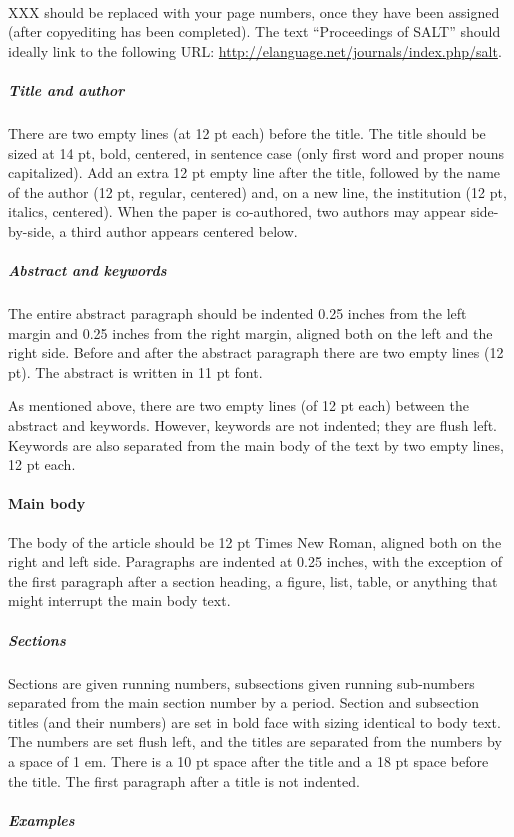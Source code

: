 \documentclass{salt}
\begin{document}
\

XXX should be replaced with your page numbers, once they have been assigned (after copyediting has been completed). The text ``Proceedings of SALT'' should ideally link to the following URL: \url{http://elanguage.net/journals/index.php/salt}.

\subparagraph{Title and author}
There are two empty lines (at 12 pt each) before the title. The title should be sized at 14 pt, bold, centered, in sentence case (only first word and proper nouns capitalized). Add an extra 12 pt empty line after the title, followed by the name of the author (12 pt, regular, centered) and, on a new line, the institution (12 pt, italics, centered). When the paper is co-authored, two authors may appear side-by-side, a third author appears centered below.

\subparagraph{Abstract and keywords}
The entire abstract paragraph should be indented 0.25 inches from the left margin and 0.25 inches from the right margin, aligned both on the left and the right side. Before and after the abstract paragraph there are two empty lines (12 pt). The abstract is written in 11 pt font.

As mentioned above, there are two empty lines (of 12 pt each) between the abstract and keywords. However, keywords are not indented; they are flush left. Keywords are also separated from the main body of the text by two empty lines, 12 pt each.


\paragraph{Main body}
The body of the article should be 12 pt Times New Roman, aligned both on the right and left side. Paragraphs are indented at 0.25 inches, with the exception of the first paragraph after a section heading, a figure, list, table, or anything that might interrupt the main body text.

\subparagraph{Sections}

Sections are given running numbers, subsections given running sub-numbers separated from the main section number by a period. Section and subsection titles (and their numbers) are set in bold face with sizing identical to body text. The numbers are set flush left, and the titles are separated from the numbers by a space of 1 em. There is a 10 pt space after the title and a 18 pt space before the title. The first paragraph after a title is not indented.

\subparagraph{Examples}
\end{document}
